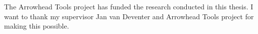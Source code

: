 The Arrowhead Tools project has funded the research conducted in this thesis.
I want to thank my supervisor Jan van Deventer and Arrowhead Tools project for making this possible.